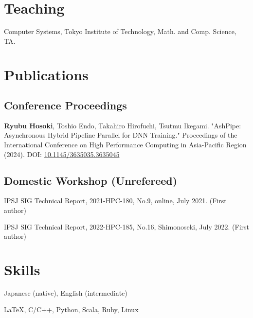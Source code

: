 \documentclass[10pt]{article}
\begin{document}
\section{Teaching}
\begin{description}[align=left,leftmargin=1.2cm,style=multiline]
  \item[2023] Computer Systems, Tokyo Institute of Technology, Math. and Comp. Science, TA.
\end{description}


\section{Publications}
\subsection{Conference Proceedings}
\begin{description}[align=left,leftmargin=0.5cm,style=multiline]
  \item[1.] 
  {\bf Ryubu Hosoki}, Toshio Endo, Takahiro Hirofuchi, Tsutmu Ikegami. "AshPipe: Asynchronous Hybrid Pipeline Parallel for DNN Training." Proceedings of the International Conference on High Performance Computing in Asia-Pacific Region (2024). {\small DOI: \href{https://dl.acm.org/doi/10.1145/3635035.3635045}{10.1145/3635035.3635045}}
\end{description}

\subsection{Domestic Workshop (Unrefereed)}
\begin{description}[align=left,leftmargin=0.5cm,style=multiline]
  \item[1.] IPSJ SIG Technical Report, 2021-HPC-180, No.9, online, July 2021. (First author)
  \item[2.] IPSJ SIG Technical Report, 2022-HPC-185, No.16, Shimonoseki, July 2022. (First author)
\end{description}


\section{Skills}
\begin{description}[align=left,leftmargin=2.5cm,style=multiline]
  \setlength{\itemsep}{0pt}
  \item [Languages] Japanese (native), English (intermediate)
  \item [Coding] \LaTeX, C/C++, Python, Scala, Ruby, Linux
\end{description}
\end{document}
